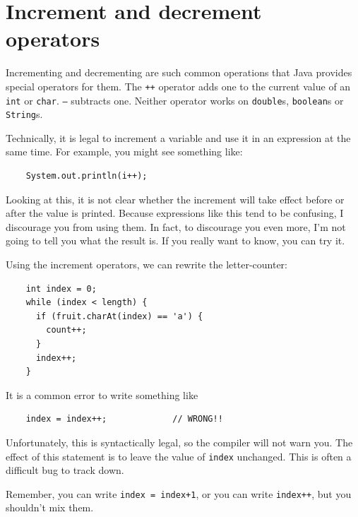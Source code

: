 \documentclass[12pt]{book}
\theoremstyle{exercise}
\begin{document}
\section{Increment and decrement operators}

Incrementing and decrementing are such common operations that
Java provides special operators for them.  The {\tt ++}
operator adds one to the current value of an {\tt int} or
{\tt char}.  {\tt --} subtracts one.  Neither operator works
on {\tt double}s, {\tt boolean}s or {\tt String}s.

Technically, it is legal to increment a variable and use it
in an expression at the same time.  For example, you might see
something like:

\begin{lstlisting}
    System.out.println(i++);
\end{lstlisting}
%
Looking at this, it is not clear whether the increment will
take effect before or after the value is printed.  Because
expressions like this tend to be confusing, I discourage
you from using them.  In fact, to discourage you even more,
I'm not going to tell you what the result is.  If you really
want to know, you can try it.

Using the increment operators, we can rewrite the letter-counter:

\begin{lstlisting}
    int index = 0;
    while (index < length) {
      if (fruit.charAt(index) == 'a') {
        count++;
      }
      index++;
    }
\end{lstlisting}
%
It is a common error to write something like

\begin{lstlisting}
    index = index++;             // WRONG!!
\end{lstlisting}
%
Unfortunately, this is syntactically legal, so the compiler
will not warn you.  The effect of this statement is to leave
the value of {\tt index} unchanged.  This is often a difficult
bug to track down.

Remember, you can write {\tt index = index+1}, or you
can write {\tt index++}, but you shouldn't mix them.

\end{document}
